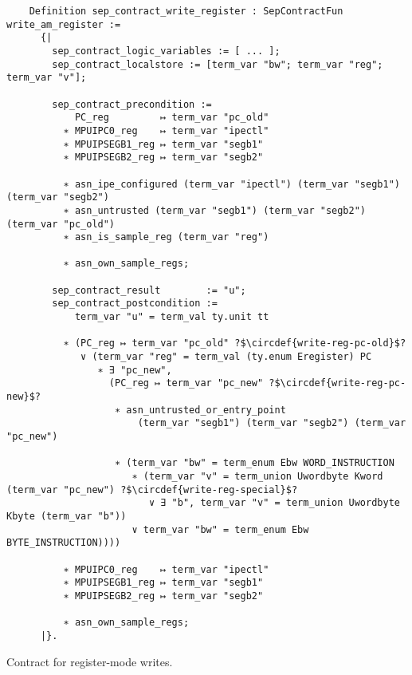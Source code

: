 \begin{listing}
  \startcstep
  \begin{verbatim}
    Definition sep_contract_write_register : SepContractFun write_am_register :=
      {|
        sep_contract_logic_variables := [ ... ];
        sep_contract_localstore := [term_var "bw"; term_var "reg"; term_var "v"];

        sep_contract_precondition :=
            PC_reg         ↦ term_var "pc_old"
          ∗ MPUIPC0_reg    ↦ term_var "ipectl"
          ∗ MPUIPSEGB1_reg ↦ term_var "segb1"
          ∗ MPUIPSEGB2_reg ↦ term_var "segb2"

          ∗ asn_ipe_configured (term_var "ipectl") (term_var "segb1") (term_var "segb2")
          ∗ asn_untrusted (term_var "segb1") (term_var "segb2") (term_var "pc_old")
          ∗ asn_is_sample_reg (term_var "reg")

          ∗ asn_own_sample_regs;

        sep_contract_result        := "u";
        sep_contract_postcondition :=
            term_var "u" = term_val ty.unit tt

          ∗ (PC_reg ↦ term_var "pc_old" ?$\circdef{write-reg-pc-old}$?
             ∨ (term_var "reg" = term_val (ty.enum Eregister) PC
                ∗ ∃ "pc_new",
                  (PC_reg ↦ term_var "pc_new" ?$\circdef{write-reg-pc-new}$?
                   ∗ asn_untrusted_or_entry_point
                       (term_var "segb1") (term_var "segb2") (term_var "pc_new")

                   ∗ (term_var "bw" = term_enum Ebw WORD_INSTRUCTION
                      ∗ (term_var "v" = term_union Uwordbyte Kword (term_var "pc_new") ?$\circdef{write-reg-special}$?
                         ∨ ∃ "b", term_var "v" = term_union Uwordbyte Kbyte (term_var "b"))
                      ∨ term_var "bw" = term_enum Ebw BYTE_INSTRUCTION))))

          ∗ MPUIPC0_reg    ↦ term_var "ipectl"
          ∗ MPUIPSEGB1_reg ↦ term_var "segb1"
          ∗ MPUIPSEGB2_reg ↦ term_var "segb2"

          ∗ asn_own_sample_regs;
      |}.
  \end{verbatim}
  \caption{Contract for register-mode writes.}
  \label{lst:write_register}
\end{listing}


